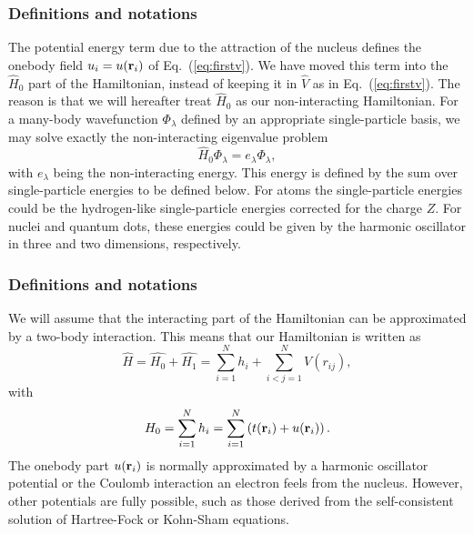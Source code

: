 \documentclass[compress]{beamer}
\begin{document}
\frame
{
  \frametitle{Definitions and notations}
\begin{small}
{\scriptsize
The potential energy term due to the attraction of the nucleus defines the onebody field $u_i=u({\bf r}_i)$ of Eq.~(\ref{eq:firstv}).
We have moved this term into the $\hat{H}_0$ part of the Hamiltonian, instead of keeping  it in $\hat{V}$ as in  Eq.~(\ref{eq:firstv}).
The reason is that we will hereafter treat $\hat{H}_0$ as our non-interacting  Hamiltonian. For a many-body wavefunction $\Phi_{\lambda}$ defined by an  
appropriate single-particle  basis, we may solve exactly the non-interacting eigenvalue problem 
\[
\hat{H}_0\Phi_{\lambda}= e_{\lambda}\Phi_{\lambda},
\]
with $e_{\lambda}$ being the non-interacting energy. This energy is defined by the sum over single-particle  energies to be defined below.
For atoms the single-particle  energies could be the hydrogen-like single-particle  energies corrected for the charge $Z$. For nuclei and quantum
dots, these energies could be given by the harmonic oscillator in three and two dimensions, respectively.
}
\end{small}
}

\frame
{
  \frametitle{Definitions and notations}
\begin{small}
{\scriptsize
We will assume that the interacting part of the Hamiltonian
can be approximated by a two-body interaction.
This means that our Hamiltonian is written as 
\begin{equation}
    \hat{H} = \hat{H_0} + \hat{H_1} 
    = \sum_{i=1}^N h_i + \sum_{i<j=1}^N V(r_{ij}),
\label{Hnuclei}
\end{equation}
with 
\begin{equation}
  H_0=\sum_{i=1}^N h_i =  \sum_{i=1}^N\left(t({\bf r}_i) + u({\bf r}_i)\right).
\label{hinuclei}
\end{equation}
The onebody part $u({\bf r}_i)$ is normally approximated by a harmonic oscillator potential or the Coulomb interaction an electron feels from the nucleus. However, other potentials are fully possible, such as 
those derived from the self-consistent solution of Hartree-Fock or Kohn-Sham 
equations.
}
\end{small}
}
\end{document}
